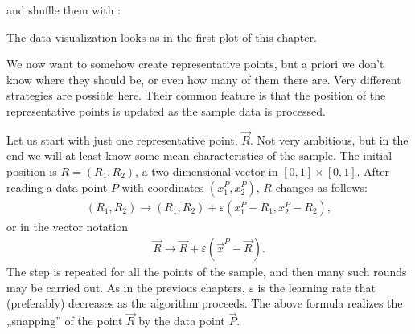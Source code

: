 \documentclass[a4paper,12pt,polish]{jupyterBook}
\begin{document}
\sphinxAtStartPar
and shuffle them with :
\begin{sphinxVerbatimInput}

\begin{sphinxVerbatim}[commandchars=\\\{\}]
\end{sphinxVerbatim}
\end{sphinxVerbatimInput}

\sphinxAtStartPar
The data visualization looks as in the first plot of this chapter.

\sphinxAtStartPar
We now want to somehow create representative points, but a priori we don’t know where they should be, or even how many of them there are. Very different strategies are possible here. Their common feature is that the position of the representative points is updated as the sample data is processed.

\sphinxAtStartPar
Let us start with just one representative point, \(\vec{R}\). Not very ambitious, but in the end we will at least know some mean characteristics of the sample. The initial position is \( R=(R_1, R_2) \), a two dimensional vector in \([0,1]\times [0,1]\). After reading a data point \(P\) with coordinates \( (x_1 ^ P, x_2 ^ P) \), \(R\) changes as follows:
\begin{equation*}
\begin{split} (R_1, R_2) \to (R_1, R_2) + \varepsilon (x_1 ^P-R_1, x_2 ^P-R_2), \end{split}
\end{equation*}
\sphinxAtStartPar
or in the vector notation
\begin{equation*}
\begin{split} \vec {R} \to \vec {R} + \varepsilon (\vec {x}^P - \vec {R}). \end{split}
\end{equation*}
\sphinxAtStartPar
The step is repeated for all the points of the sample, and then many such rounds may be carried out. As in the previous chapters, \( \varepsilon \) is the learning rate that (preferably) decreases
as the algorithm proceeds. The above formula realizes the „snapping” of the point \(\vec{R}\) by the data point \(\vec{P}\).
\end{document}
